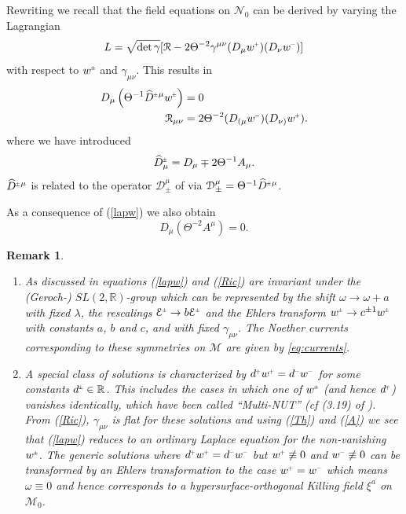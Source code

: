 \documentclass[a4paper,10pt,reqno]{amsart}
\newcommand{\cE}{\mathcal{E}}
\newcommand{\cR}{\mathcal{R}}
\newcommand{\cM}{\mathcal{M}}
\newcommand{\cN}{\mathcal{N}}
\newcommand{\wh}{\widehat}
\theoremstyle{plain}
\newtheorem{remark}[thm]{Remark}
\renewcommand{\P}[1]{{{#1}^{\hspace{-.5pt}\scaleto{+}{4pt}}}}
\newcommand{\M}[1]{{{#1}^{\hspace{-.5pt}\scaleto{-}{4pt}}}}
\newcommand{\PM}[1]{{{#1}^{\hspace{-.5pt}\scaleto{\pm}{3.5pt}}}}
\newcommand{\MP}[1]{{{#1}^{\hspace{-.5pt}\scaleto{\mp}{3.5pt}}}}
\numberwithin{equation}{section}
\begin{document}
Rewriting \cite[Eq. (5.18)]{gibbons:hawking:1979}  we recall that the  field equations on $\cN_0$ 
can be derived by varying the Lagrangian
\begin{equation} \label{Lag}
L = \sqrt{\det \gamma}[\cR-2\Theta^{-2}\gamma^{\mu\nu}(D_{\mu}\P{w})(D_{\nu}\M{w})]
\end{equation}
with respect to $\PM{w}$ and $\gamma_{\mu\nu}$. This results in
\begin{align}
\label{lapw}
D_{\mu}\left( \Theta^{-1} \PM{\wh D}{}^{\mu} \PM{w} \right) ={}&  0 \\
\label{Ric}
\cR_{\mu\nu} ={}& 2\Theta^{-2}(D_{(\mu}\M{w})(D_{\nu)}\P{w}).
\end{align}
where we have introduced
\begin{equation}
\label{dhat}
\PM{\wh D}_{\mu} = D_{\mu} \mp 2\Theta^{-1}A_{\mu}.
\end{equation}
%
 $\PM{\wh D}{}^{\mu}$ is related to the operator $\mathcal{D}^{\mu}_{\pm}$ of \cite{simon:1995}
via $\mathcal {D}^{\mu}_{\pm}  = \Theta^{-1} \PM{\wh D}{}^{\mu}$.
  
 
As a consequence of (\ref{lapw}) we also obtain 
\begin{equation}
D_{\mu}( \Theta^{-2} A^{\mu}) = 0. 
\end{equation}

\begin{remark}~
\begin{enumerate}
\item
As discussed in \cite[Sect. 5]{gibbons:hawking:1979}  equations (\ref{lapw}) and (\ref{Ric}) are invariant  under the (Geroch-) $SL(2,\mathbb{R})$-group \cite{1971JMP....12..918G}  which can be represented by the shift $\omega \rightarrow \omega + a$
with fixed $\lambda$, the rescalings $\PM{\cE} \rightarrow b \PM{\cE}$ and the Ehlers transform 
$\PM{w} \rightarrow c^{\pm 1} \PM{w}$  with constants $a$, $b$ and $c$, and with fixed
$\gamma_{\mu\nu}$.  The Noether currents corresponding to these symmetries on $\cM$ are given by \eqref{eq:currents}.  
%
%
%
\item
A special class of solutions  is characterized by $\P{d} \P{w} = \M{d} \M{w}$  for some 
 constants $\PM{d} \in {\mathbb{R}}$. This includes the cases in which one of $\PM{w}$ (and hence $\MP{d}$) vanishes identically, which have been  called ``Multi-NUT'' (cf (3.19) of \cite{gibbons:hawking:1979}). From (\ref{Ric}), $\gamma_{\mu\nu}$ is flat for these solutions and using (\ref{Th}) and (\ref{A}) we see that (\ref{lapw}) reduces to an ordinary Laplace equation for the non-vanishing $\PM{w}$.  The generic solutions where $\P{d} \P{w} = \M{d} \M{w}$ but $\P{w} \not\equiv 0$ and $\M{w} \not\equiv 0$  
 can be transformed by an Ehlers transformation to the case $ \P{w} = \M{w}$ which means $\omega \equiv 0$ and hence corresponds to a hypersurface-orthogonal Killing field $\xi^{a}$ on $\cM_0$.
%
%
%
\end{enumerate}

\end{remark}
\end{document}
